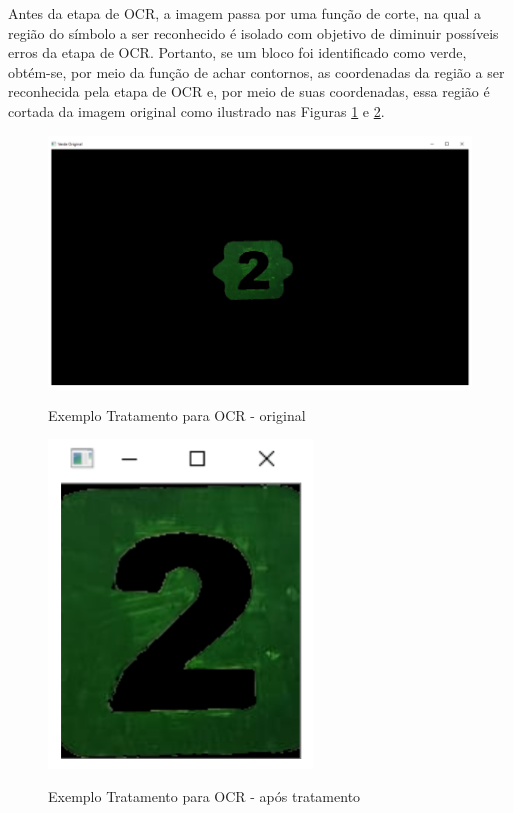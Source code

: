     Antes da etapa de OCR, a imagem passa por uma função de corte, na qual a região do símbolo a ser reconhecido é isolado com objetivo de diminuir possíveis erros da etapa de OCR. Portanto, se um bloco foi identificado como verde, obtém-se, por meio da função de achar contornos,  as coordenadas da região a ser reconhecida pela etapa de OCR e, por meio de suas coordenadas, essa região é cortada da imagem original como ilustrado nas Figuras \ref{figura:ex2_original} e \ref{figura:ex2_tratado}.
    
    \begin{figure}[H]
        \caption{Exemplo Tratamento para OCR - original}
        \centering
        \includegraphics[width=14cm]{Imagens/Cap4/ex2_original.PNG}
        \label{figura:ex2_original}
    \end{figure}
    
    
    \begin{figure}[H]
        \caption{Exemplo Tratamento para OCR - após tratamento}
        \centering
        \includegraphics[width=7cm]{Imagens/Cap4/ex2_tratado.PNG}
        \label{figura:ex2_tratado}
    \end{figure}
    
